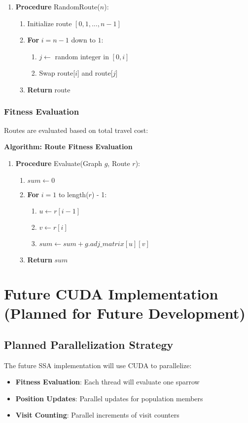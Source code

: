 \documentclass[conference]{IEEEtran}
\begin{document}
\begin{enumerate}
\item \textbf{Procedure} RandomRoute($n$):
    \begin{enumerate}
    \item Initialize route $[0, 1, ..., n-1]$
    \item \textbf{For} $i = n-1$ down to $1$:
        \begin{enumerate}
        \item $j \gets$ random integer in $[0, i]$
        \item Swap route[$i$] and route[$j$]
        \end{enumerate}
    \item \textbf{Return} route
    \end{enumerate}
\end{enumerate}

\subsubsection{Fitness Evaluation}
Routes are evaluated based on total travel cost:

\noindent\textbf{Algorithm: Route Fitness Evaluation}

\begin{enumerate}
\item \textbf{Procedure} Evaluate(Graph $g$, Route $r$):
    \begin{enumerate}
    \item $sum \gets 0$
    \item \textbf{For} $i = 1$ to length($r$) - 1:
        \begin{enumerate}
        \item $u \gets r[i-1]$
        \item $v \gets r[i]$
        \item $sum \gets sum + g.adj\_matrix[u][v]$
        \end{enumerate}
    \item \textbf{Return} $sum$
    \end{enumerate}
\end{enumerate}

\section{Future CUDA Implementation (Planned for Future Development)}

\subsection{Planned Parallelization Strategy}
The future SSA implementation will use CUDA to parallelize:
\begin{itemize}
    \item \textbf{Fitness Evaluation}: Each thread will evaluate one sparrow
    \item \textbf{Position Updates}: Parallel updates for population members
    \item \textbf{Visit Counting}: Parallel increments of visit counters
\end{itemize}
\end{document}
